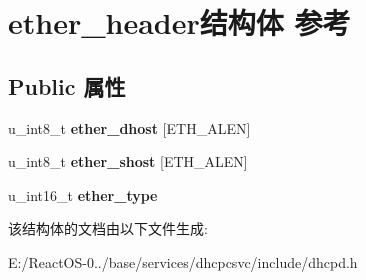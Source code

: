 \hypertarget{structether__header}{}\section{ether\+\_\+header结构体 参考}
\label{structether__header}
\subsection*{Public 属性}
\begin{DoxyCompactItemize}
\item 
\mbox{\label{structether__header_ac87cc3dd27ba536e5efc5a9efb4abf37}} 
u\+\_\+int8\+\_\+t {\bfseries ether\+\_\+dhost} \mbox{[}E\+T\+H\+\_\+\+A\+L\+EN\mbox{]}
\item 
\mbox{\label{structether__header_a2c6fd04cf41cca44d4580d156d0fd650}} 
u\+\_\+int8\+\_\+t {\bfseries ether\+\_\+shost} \mbox{[}E\+T\+H\+\_\+\+A\+L\+EN\mbox{]}
\item 
\mbox{\label{structether__header_a74a51d7b1a63d029be345f74fce2edf8}} 
u\+\_\+int16\+\_\+t {\bfseries ether\+\_\+type}
\end{DoxyCompactItemize}


该结构体的文档由以下文件生成\+:\begin{DoxyCompactItemize}
\item 
E\+:/\+React\+O\+S-\/0../base/services/dhcpcsvc/include/dhcpd.\+h\end{DoxyCompactItemize}
